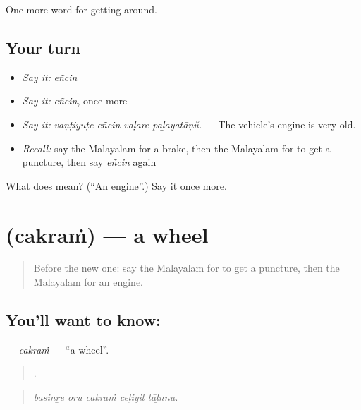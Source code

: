 \begin{grammarlens}[title={What you've built}]
One more word for getting around.
\end{grammarlens}

\subsection*{Your turn}
\begin{itemize}
\raggedright
  \item \emph{Say it:} \emph{eñcin}
  \item \emph{Say it:} \emph{eñcin}, once more
  \item \emph{Say it:} \emph{vaṇṭiyuṭe eñcin vaḷare paḻayatāṇŭ.} — The vehicle's engine is very old.
  \item \emph{Recall:} say the Malayalam for a brake, then the Malayalam for to get a puncture, then say \emph{eñcin} again
\end{itemize}

\begin{tcolorbox}[breakable,colback=teal!4,colframe=teal!35!black,title={Before you move on}]
What does  mean? (\textquotedblleft{}An engine\textquotedblright{}.) Say it once more.
\end{tcolorbox}
\section[\texorpdfstring{\ml{ചക്രം} (cakraṁ)}{ചക്രം (cakraṁ)}]{ (cakraṁ) — a wheel}

\label{lesson:ML-C471-cakram}



\begin{quote}
Before the new one: say the Malayalam for to get a puncture, then the Malayalam for an engine.
\end{quote}

\subsection*{You'll want to know: }
\textbf{} — \emph{cakraṁ} — \textquotedblleft{}a wheel\textquotedblright{}.

\begin{quote}
    .
\end{quote}

\begin{quote}
\emph{basinṟe oru cakraṁ ceḷiyil tāḻnnu.}
\end{quote}


